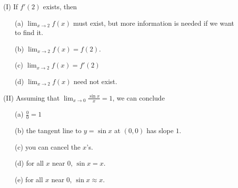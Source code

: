 \documentclass[handout,nooutcomes]{ximera}
\begin{document}
\newpage
\begin{problem}
  \mbox{}
  \begin{itemize}
    \item[(I)]
      If $f'(2)$ exists, then
      \begin{itemize}
        \item[(a)]
          $\lim_{x \to 2} f(x)$ must exist, but more information is needed if we want to find it.

        \item[(b)]
          $\lim_{x \to 2} f(x) = f(2)$.

        \item[(c)]
          $\lim_{x \to 2} f(x) = f'(2)$

        \item[(d)] 
          $\lim_{x \to 2} f(x)$ need not exist.
      \end{itemize}

    \item[(II)]
      Assuming that $\lim_{x \to 0} \frac{\sin x}{x} = 1$, we can conclude
      \begin{itemize}
        \item[(a)]
          $\frac{0}{0} = 1$
        \item[(b)]
          the tangent line to $y = \sin x$ at $(0,0)$ has slope $1$.

        \item[(c)]
          you can cancel the $x$'s.

        \item[(d)]
          for all $x$ near $0$, $\sin x = x$.

        \item[(e)]
          for all $x$ near $0$, $\sin x \approx x$.
      \end{itemize}
  \end{itemize}
\end{problem}
\end{document}
